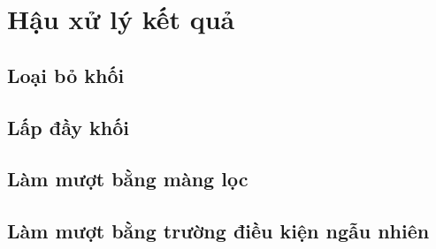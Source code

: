 \chapter{Hậu xử lý kết quả}
\section{Loại bỏ khối}
\section{Lấp đầy khối}
\section{Làm mượt bằng màng lọc}
\section{Làm mượt bằng trường điều kiện ngẫu nhiên}





